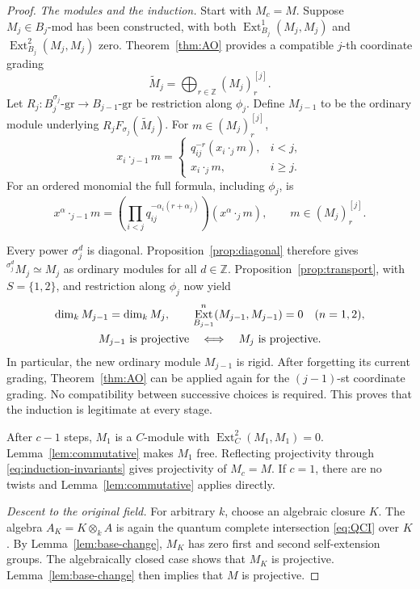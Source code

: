 \documentclass[10pt,a4paper]{amsart}
\numberwithin{equation}{section}
\DeclareMathOperator{\Ext}{Ext}
\newcommand{\Z}{\mathbb Z}
\newcommand{\gmod}[1]{#1\text{-}\mathrm{gr}}
\newcommand{\umod}[1]{#1\text{-}\mathrm{mod}}
\newcommand{\tw}[2]{{}^{#1}\!#2}
\begin{document}
\begin{proof}
\smallskip\noindent
\emph{The modules and the induction.}
Start with \(M_c=M\). Suppose \(M_j\in\umod{B_j}\) has been constructed,
with both \(\Ext_{B_j}^1(M_j,M_j)\) and \(\Ext_{B_j}^2(M_j,M_j)\) zero.
Theorem~\ref{thm:AO} provides a compatible \(j\)-th coordinate grading
\[
 \widetilde M_j=\bigoplus_{r\in\Z}(M_j)_r^{[j]}.
\]
Let \(R_j:\gmod{B_j^{\sigma_j}}\to\gmod{B_{j-1}}\) be restriction along
\(\phi_j\). Define \(M_{j-1}\) to be the ordinary module underlying
\(R_jF_{\sigma_j}(\widetilde M_j)\). For \(m\in(M_j)_r^{[j]}\),
\begin{equation*}
 x_i\cdot_{j-1}m=
 \begin{cases}
 q_{ij}^{-r}(x_i\cdot_jm),&i<j,\\
 x_i\cdot_jm,&i\geq j.
 \end{cases}
\end{equation*}
For an ordered monomial the full formula, including \(\phi_j\), is
\begin{equation*}
 x^\alpha\cdot_{j-1}m=
 \left(\prod_{i<j}q_{ij}^{-\alpha_i(r+\alpha_j)}\right)
 (x^\alpha\cdot_jm),
 \qquad m\in(M_j)_r^{[j]}.
\end{equation*}

Every power \(\sigma_j^d\) is diagonal. Proposition~\ref{prop:diagonal}
therefore gives \(\tw{\sigma_j^d}{M_j}\simeq M_j\) as ordinary modules
for all \(d\in\Z\). Proposition~\ref{prop:transport}, with
\(S=\{1,2\}\), and restriction along \(\phi_j\) now yield
\begin{gather}\label{eq:induction-invariants}
 \dim_kM_{j-1}=\dim_kM_j,\qquad
 \Ext_{B_{j-1}}^n(M_{j-1},M_{j-1})=0\quad(n=1,2),\\
 M_{j-1}\text{ is projective}
 \quad\Longleftrightarrow\quad M_j\text{ is projective}.\notag
\end{gather}
In particular, the new ordinary module \(M_{j-1}\) is rigid. After
forgetting its current grading, Theorem~\ref{thm:AO} can be applied
again for the \((j-1)\)-st coordinate grading. No compatibility between
successive choices is required. This proves that the induction is
legitimate at every stage.

After \(c-1\) steps, \(M_1\) is a \(C\)-module with
\(\Ext_C^2(M_1,M_1)=0\). Lemma~\ref{lem:commutative} makes \(M_1\)
free. Reflecting projectivity through \eqref{eq:induction-invariants}
gives projectivity of \(M_c=M\). If \(c=1\), there are no twists and
Lemma~\ref{lem:commutative} applies directly.

\smallskip\noindent
\emph{Descent to the original field.}
For arbitrary \(k\), choose an algebraic closure \(K\). The algebra
\(A_K=K\otimes_kA\) is again the quantum complete intersection
\eqref{eq:QCI} over \(K\). By Lemma~\ref{lem:base-change}, \(M_K\)
has zero first and second self-extension groups. The algebraically closed case shows that \(M_K\) is projective.
Lemma~\ref{lem:base-change} then implies that \(M\) is projective.
\end{proof}
\end{document}
